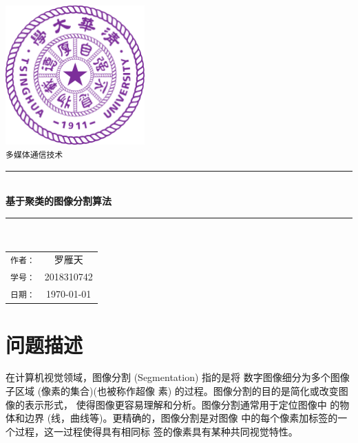 \documentclass[a4paper]{article}
\begin{document}
\newcommand{\HRule}{\rule{\linewidth}{0.5mm}}
\begin{titlepage}
	\begin{center}
		\includegraphics[width=0.4\textwidth]{Tsinghua2.png}\\[1cm]
		\textsc{\Large \texttt{多媒体通信技术}}\\[1cm]
		\HRule \\[1cm]
		{\Huge \bfseries 基于聚类的图像分割算法}\\[0.4cm]
		\HRule \\[3.5cm]
		\begin{minipage}{0.4\textwidth}
			\begin{center}
				\Large
				\begin{tabular}{cc}
					\texttt{作者：} & 罗雁天 \\[0.5cm]
					\texttt{学号：} & 2018310742 \\[0.5cm]
					\texttt{日期：} & \today
				\end{tabular}
			\end{center}
		\end{minipage}
		\vfill
	\end{center}
\end{titlepage}


\tableofcontents
\newpage

\section{问题描述}
在计算机视觉领域，图像分割 (Segmentation) 指的是将 数字图像细分为多个图像子区域 (像素的集合)(也被称作超像 素) 的过程。图像分割的目的是简化或改变图像的表示形式， 使得图像更容易理解和分析。图像分割通常用于定位图像中 的物体和边界 (线，曲线等)。更精确的，图像分割是对图像 中的每个像素加标签的一个过程，这一过程使得具有相同标 签的像素具有某种共同视觉特性。
\end{document}
